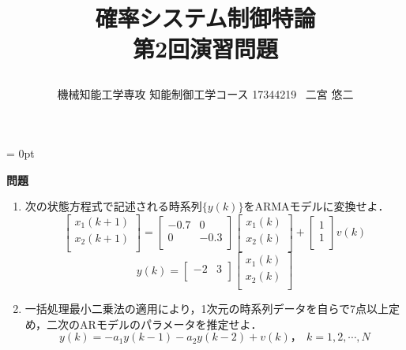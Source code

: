 \documentclass[a4paper,11pt]{jarticle}
\title{\vspace{-20truemm}
{\normalsize \rightline{平成29年\ 10月\ 18日}}
{\large 確率システム制御特論\\}
第2回演習問題\\
\date{}
\vspace{-2truemm}}
\author{機械知能工学専攻 知能制御工学コース \hspace{3mm} 17344219 \ 二宮 悠二}
\begin{document}
\parindent = 0pt %
\titlepage
\maketitle
{\Large{\bf 問題}}
\begin{enumerate}
 \item 次の状態方程式で記述される時系列$ \{ y(k) \} $をARMAモデルに変換せよ．
       \begin{equation}
	\left[
	 \begin{array}{c}
	  x_1(k+1) \\
	  x_2(k+1) \\
	 \end{array}
	\right] = \left[
		  \begin{array}{cc}
		   -0.7 & 0 \\
		   0 & -0.3 \\
		  \end{array}
		  \right]
	\left[
	\begin{array}{c}
	 x_1(k) \\
	 x_2(k) \\
	\end{array}
	\right] + \left[
		  \begin{array}{c}
		   1 \\
		   1 \\
		  \end{array}
		  \right] v(k)
	\label{status}
       \end{equation}
       \begin{equation}
		y(k) = \left[
	       \begin{array}{cc}
		-2 & 3 \\
	       \end{array}
	       \right] \left[
		       \begin{array}{c}
			x_1(k) \\
			x_2(k)\\
		       \end{array}
		       \right]
	\label{output}
       \end{equation}

 \item 一括処理最小二乗法の適用により，1次元の時系列データを自らで7点以上定め，二次のARモデルのパラメータを推定せよ．\\
       \begin{equation}
	y(k) = - a_1y(k-1) - a_2y(k-2) + v(k)，~~ k = 1,2,\cdots, N
       \end{equation}
\label{3}
\end{enumerate}
\end{document}
